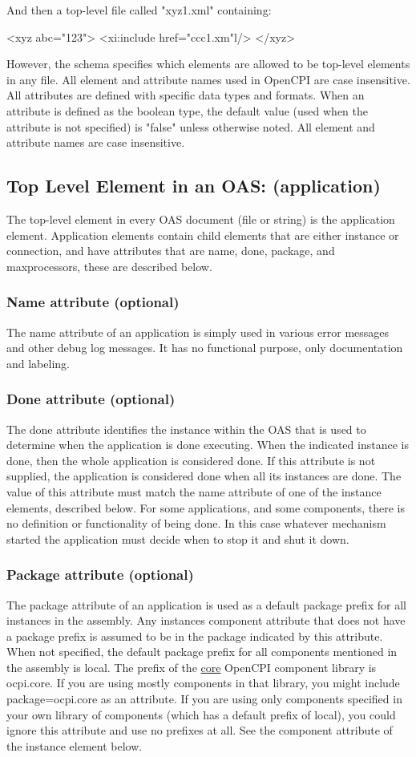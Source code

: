 \documentclass[10pt, a4paper, oneside]{article}
\renewcommand\_{\textunderscore\allowbreak} %
\begin{document}
And then a top-level file called "xyz1.xml" containing: 
\begin{ocpixml}
<xyz abc="123">
<xi:include href="ccc1.xm"l/>
</xyz> \end{ocpixml}
However, the schema specifies which elements are allowed to be top-level elements in any file.  All element and attribute names used in OpenCPI are case insensitive. All attributes are defined with specific data types and formats. When an attribute is defined as the boolean type, the default value (used when the attribute is not specified) is "false" unless otherwise noted. All element and attribute names are case insensitive.
\subsection{Top Level Element in an OAS: (application)}The top-level element in every OAS document (file or string) is the application element.  Application elements contain child elements that are either instance or connection, and have attributes that are name, done, package, and maxprocessors, these are described below.
\subsubsection{Name attribute (optional)}The name attribute of an application is simply used in various error messages and other debug log messages.  It has no functional purpose, only documentation and labeling.
\subsubsection{Done attribute (optional)}The done attribute identifies the instance within the OAS that is used to determine when the application is done executing.  When the indicated instance is done, then the whole application is considered done.  If this attribute is not supplied, the application is considered done when all its instances are done. The value of this attribute must match the name attribute of one of the instance elements, described below. For some applications, and some components, there is no definition or functionality of being done. In this case whatever mechanism started the application must decide when to stop it and shut it down.
\subsubsection{Package attribute (optional)}The package attribute of an application is used as a default package prefix for all instances in the assembly. Any instances component attribute that does not have a package prefix is assumed to be in the package indicated by this attribute. When not specified, the default package prefix for all components mentioned in the assembly is local. The prefix of the \hyperlink{core}{core} OpenCPI component library is ocpi.core.  If you are using mostly components in that library, you might include package=ocpi.core as an attribute.  If you are using only components specified in your own library of components (which has a default prefix of local), you could ignore this attribute and use no prefixes at all. See the component attribute of the instance element below.
\end{document}
